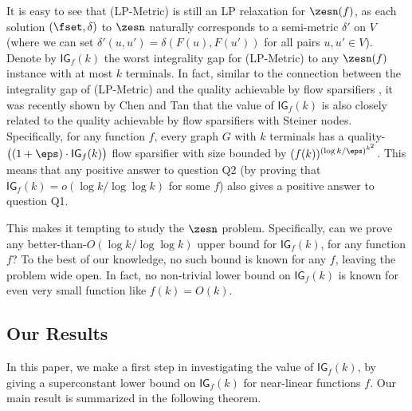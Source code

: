 It is easy to see that (\textsf{LP-Metric}) is still an LP relaxation for $\zesn(f)$, as each solution $(\fset,\delta)$ to $\zesn$ naturally corresponds to a semi-metric $\delta'$ on $V$ (where we can set $\delta'(u,u')=\delta(F(u),F(u'))$ for all pairs $u,u'\in V$). 
Denote by $\textsf{IG}_f(k)$ the worst integrality gap for (\textsf{LP-Metric}) to any $\zesn(f)$ instance with at most $k$ terminals.
In fact, similar to the connection between the integrality gap of (\textsf{LP-Metric}) and the quality achievable by flow sparsifiers \cite{moitra2009approximation,leighton2010extensions},
it was recently shown by Chen and Tan \cite{chen20241+} that the value of $\textsf{IG}_f(k)$ is also closely related to the quality achievable by flow sparsifiers with Steiner nodes.
Specifically, for any function $f$, every graph $G$ with $k$ terminals has a quality-$\big((1+\eps)\cdot \textsf{IG}_f(k)\big)$ flow sparsifier with size bounded by $(f(k))^{(\log k/\eps)^{k^2}}$. 
This means that any positive answer to question Q2 (by proving that $\textsf{IG}_f(k)=o(\log k/\log\log k)$ for some $f$) also gives a positive answer to question Q1.

This makes it tempting to study the $\zesn$ problem. Specifically, can we prove any better-than-$O(\log k/\log\log k)$ upper bound for $\textsf{IG}_f(k)$, for any function $f$?
To the best of our knowledge, no such bound is known for any $f$, leaving the problem wide open. 
In fact, no non-trivial lower bound on $\textsf{IG}_f(k)$ is known for even very small function like $f(k)=O(k)$.


\subsection{Our Results}

In this paper, we make a first step in investigating the value of  $\textsf{IG}_f(k)$, by giving a superconstant lower bound on $\textsf{IG}_f(k)$ for near-linear functions $f$.
Our main result is summarized in the following theorem.

